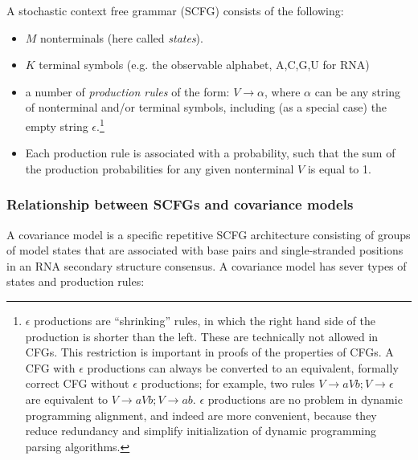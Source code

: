 \documentclass[11pt]{article}
\begin{document}
A stochastic context free grammar (SCFG) consists of the following:

\begin{itemize}
\item $M$ nonterminals (here called \emph{states}).
\item $K$ terminal symbols (e.g. the observable alphabet, {A,C,G,U} for RNA)
\item a number of \emph{production rules} of the form: $V \rightarrow
\alpha$, where $\alpha$ can be any string of nonterminal and/or
terminal symbols, including (as a special case) the empty string
$\epsilon$.\footnote{$\epsilon$ productions are ``shrinking'' rules,
in which the right hand side of the production is shorter than the
left. These are technically not allowed in CFGs. This restriction is
important in proofs of the properties of CFGs. A CFG with $\epsilon$
productions can always be converted to an equivalent, formally correct
CFG without $\epsilon$ productions; for example, two rules $V
\rightarrow a V b; V \rightarrow \epsilon$ are equivalent to $V
\rightarrow a V b; V \rightarrow ab$. $\epsilon$ productions are no
problem in dynamic programming alignment, and indeed are more
convenient, because they reduce redundancy and simplify initialization
of dynamic programming parsing algorithms.}
\item Each production rule is associated with a probability, such that
      the sum of the production probabilities for any given
      nonterminal $V$ is equal to 1.
\end{itemize} 

\subsubsection{Relationship between SCFGs and covariance models}

A covariance model is a specific repetitive SCFG architecture
consisting of groups of model states that are associated with base
pairs and single-stranded positions in an RNA secondary structure
consensus. A covariance model has sever types of states and production
rules:
\end{document}
